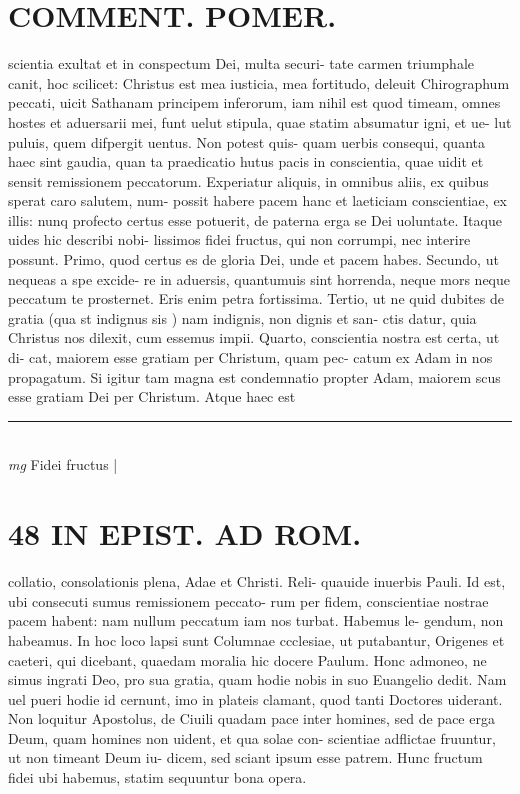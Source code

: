 \documentclass{article}
\begin{document}
\begin{pages}
\section*{COMMENT. POMER.  }\pstart scientia exultat et in conspectum Dei, multa securi- tate carmen triumphale canit, hoc scilicet: Christus est mea iusticia, mea fortitudo, deleuit Chirographum peccati, uicit Sathanam principem inferorum, iam nihil est quod timeam, omnes hostes et aduersarii mei, funt uelut stipula, quae statim absumatur igni, et ue- lut puluis, quem difpergit uentus. Non potest quis- quam uerbis consequi, quanta haec sint gaudia, quan ta praedicatio hutus pacis in conscientia, quae uidit et sensit remissionem peccatorum. Experiatur aliquis, in omnibus aliis, ex quibus sperat caro salutem, num- possit habere pacem hanc et laeticiam conscientiae, ex illis: nunq profecto certus esse potuerit, de paterna erga se Dei uoluntate. Itaque uides hic describi nobi- lissimos fidei fructus, qui non corrumpi, nec interire possunt. Primo, quod certus es de gloria Dei, unde et pacem habes. Secundo, ut nequeas a spe excide- re in aduersis, quantumuis sint horrenda, neque mors neque peccatum te prosternet. Eris enim petra fortissima. Tertio, ut ne quid dubites de gratia (qua st indignus sis ) nam indignis, non dignis et san- ctis datur, quia Christus nos dilexit, cum essemus impii. Quarto, conscientia nostra est certa, ut di- cat, maiorem esse gratiam per Christum, quam pec- catum ex Adam in nos propagatum. Si igitur tam magna est condemnatio propter Adam, maiorem scus esse gratiam Dei per Christum. Atque haec est  \pend
\vspace{0.5cm}\noindent
\vspace{0.2cm}\rule{1cm}{0.2pt}\\ 
\hspace{0.2cm}\textit{mg}
\footnotesize Fidei fructus 
\normalsize| 
\section*{48 IN EPIST. AD ROM.  }
\marginpar{[ p.]}\pstart collatio, consolationis plena, Adae et Christi. Reli- quauide inuerbis Pauli.   \pend\pstart Id est, ubi consecuti sumus remissionem peccato- rum per fidem, conscientiae nostrae pacem habent: nam nullum peccatum iam nos turbat. Habemus le- gendum, non habeamus. In hoc loco lapsi sunt Columnae ccclesiae, ut putabantur, Origenes et caeteri, qui dicebant, quaedam moralia hic docere Paulum.  Honc admoneo, ne simus ingrati Deo, pro sua gratia, quam hodie nobis in suo Euangelio dedit. Nam uel pueri hodie id cernunt, imo in plateis clamant, quod tanti Doctores uiderant. Non loquitur Apostolus, de Ciuili quadam pace inter homines, sed de pace erga Deum, quam homines non uident, et qua solae con- scientiae adflictae fruuntur, ut non timeant Deum iu- dicem, sed sciant ipsum esse patrem. Hunc fructum fidei ubi habemus, statim sequuntur bona opera.   \pend
{}
{}

\end{pages}
\end{document}
